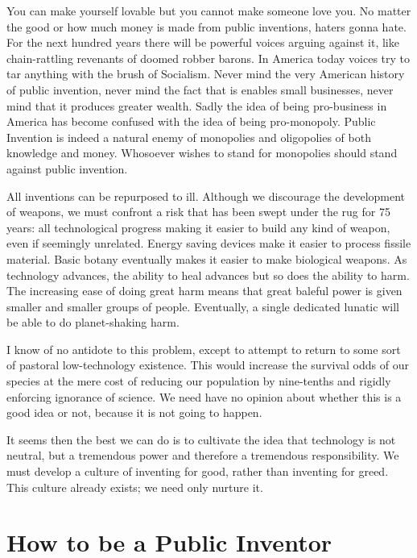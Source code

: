 \documentclass[
	fontsize=10pt, %
	twoside=false, %
	secnumdepth=1, %
]{kaobook}
\begin{document}
You can make yourself lovable but you cannot make someone love you.
No matter the good or how much money is made from public inventions, haters gonna hate.
For the next hundred years there will be powerful voices arguing against it,
like chain-rattling revenants of doomed robber barons.
In America today voices try to tar anything with the brush of Socialism.
Never mind the very American history of public invention, never mind
the fact that is enables small businesses, never mind that it
produces greater wealth.
Sadly the idea of being pro-business in America has become confused with
the idea of being pro-monopoly.
Public Invention is indeed a natural enemy of monopolies and oligopolies of
both knowledge and money.
Whosoever wishes to stand for monopolies should stand against public invention.

All inventions can be repurposed to ill.
Although we discourage the development of weapons, we must
confront a risk that has been swept under the rug for 75 years:
all technological progress making it easier to build any kind of weapon,
even if seemingly unrelated.
Energy saving devices make it easier to process fissile material.
Basic botany eventually makes it easier to make biological weapons.
As technology advances, the ability to heal advances but
so does the ability to harm.
The increasing ease of doing great harm means that great baleful power
is given  smaller and smaller groups of people.
Eventually, a single dedicated lunatic will be able
to do planet-shaking harm.

I know of no antidote to this problem, except to attempt to
return to some sort of pastoral low-technology existence.
This would increase the survival odds of our species at the
mere cost of reducing our population by nine-tenths and rigidly
enforcing ignorance of science. We need have no opinion about
whether this is a good idea or not, because it is not going to happen.

It seems then the best we can do is to cultivate the idea
that technology is not neutral, but a tremendous power and therefore
a tremendous responsibility. We must develop a culture of inventing
for good, rather than inventing for greed.
This culture already exists; we need only nurture it.



\chapter{How to be a Public Inventor}
\end{document}
